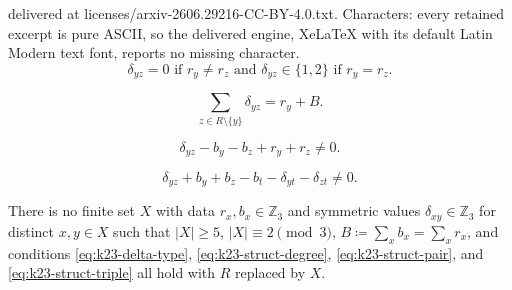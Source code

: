 \documentclass[10pt,a4paper]{amsart}
\newcommand{\Z}{\mathbb Z}
\begin{document}
delivered at licenses/arxiv-2606.29216-CC-BY-4.0.txt. Characters: every retained excerpt is pure ASCII, so the delivered engine, XeLaTeX with its default Latin Modern text font, reports no missing character.
\begin{equation}\label{eq:k23-delta-type}
    \delta_{yz}=0\text{ if }r_y\ne r_z\text{ and }\delta_{yz}\in\{1,2\}\text{ if }r_y=r_z.
\end{equation}

\begin{equation}\label{eq:k23-struct-degree}
    \sum_{z\in R\setminus\{y\}}\delta_{yz}=r_y+B.
\end{equation}

\begin{equation}\label{eq:k23-struct-pair}
    \delta_{yz}-b_y-b_z+r_y+r_z\ne0.
\end{equation}

\begin{equation}\label{eq:k23-struct-triple}
    \delta_{yz}+b_y+b_z-b_t-\delta_{yt}-\delta_{zt}\ne0.
\end{equation}

\begin{lemma}\label{lem:k23-structure}
    There is no finite set $X$ with data $r_x,b_x\in\Z_3$ and symmetric values $\delta_{xy}\in\Z_3$ for distinct $x,y\in X$ such that $|X|\ge 5$, $|X|\equiv2\pmod3$, $B\coloneqq\sum_xb_x=\sum_xr_x$, and conditions \eqref{eq:k23-delta-type}, \eqref{eq:k23-struct-degree}, \eqref{eq:k23-struct-pair}, and \eqref{eq:k23-struct-triple} all hold with $R$ replaced by $X$.
\end{lemma}
\end{document}
